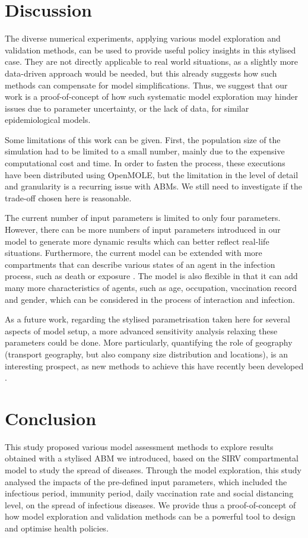 \documentclass[smallextended]{svjour3}       %
\begin{document}
\section{Discussion}

The diverse numerical experiments, applying various model exploration and validation methods, can be used to provide useful policy insights in this stylised case. They are not directly applicable to real world situations, as a slightly more data-driven approach would be needed, but this already suggests how such methods can compensate for model simplifications. Thus, we suggest that our work is a proof-of-concept of how such systematic model exploration may hinder issues due to parameter uncertainty, or the lack of data, for similar epidemiological models.

Some limitations of this work can be given. First, the population size of the simulation had to be limited to a small number, mainly due to the expensive computational cost and time. In order to fasten the process, these executions have been distributed using OpenMOLE, but the limitation in the level of detail and granularity is a recurring issue with ABMs. We still need to investigate if the trade-off chosen here is reasonable.

The current number of input parameters is limited to only four parameters. However, there can be more numbers of input parameters introduced in our model to generate more dynamic results which can better reflect real-life situations. Furthermore, the current model can be extended with more compartments that can describe various states of an agent in the infection process, such as death or exposure \cite{reyne2022principles}. The model is also flexible in that it can add many more characteristics of agents, such as age, occupation, vaccination record and gender, which can be considered in the process of interaction and infection.

As a future work, regarding the stylised parametrisation taken here for several aspects of model setup, a more advanced sensitivity analysis relaxing these parameters could be done. More particularly, quantifying the role of geography (transport geography, but also company size distribution and locations), is an interesting prospect, as new methods to achieve this have recently been developed \cite{raimbault2019space}.


\section{Conclusion}

This study proposed various model assessment methods to explore results obtained with a stylised ABM we introduced, based on the SIRV compartmental model to study the spread of diseases. Through the model exploration, this study analysed the impacts of the pre-defined input parameters, which included the infectious period, immunity period, daily vaccination rate and social distancing level, on the spread of infectious diseases. We provide thus a proof-of-concept of how model exploration and validation methods can be a powerful tool to design and optimise health policies.





\end{document}
